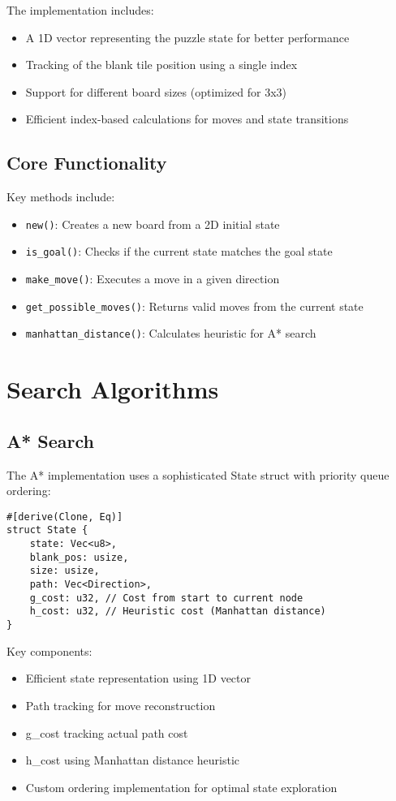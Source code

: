 \documentclass[a4paper]{article}
\begin{document}
The implementation includes:
\begin{itemize}
    \item A 1D vector representing the puzzle state for better performance
    \item Tracking of the blank tile position using a single index
    \item Support for different board sizes (optimized for 3x3)
    \item Efficient index-based calculations for moves and state transitions
\end{itemize}

\subsection{Core Functionality}
Key methods include:
\begin{itemize}
    \item \texttt{new()}: Creates a new board from a 2D initial state
    \item \texttt{is\_goal()}: Checks if the current state matches the goal state
    \item \texttt{make\_move()}: Executes a move in a given direction
    \item \texttt{get\_possible\_moves()}: Returns valid moves from the current state
    \item \texttt{manhattan\_distance()}: Calculates heuristic for A* search
\end{itemize}

\section{Search Algorithms}
\subsection{A* Search}
The A* implementation uses a sophisticated State struct with priority queue ordering:

\begin{lstlisting}[style=rustcode]
#[derive(Clone, Eq)]
struct State {
    state: Vec<u8>,
    blank_pos: usize,
    size: usize,
    path: Vec<Direction>,
    g_cost: u32, // Cost from start to current node
    h_cost: u32, // Heuristic cost (Manhattan distance)
}
\end{lstlisting}

Key components:
\begin{itemize}
    \item Efficient state representation using 1D vector
    \item Path tracking for move reconstruction
    \item g\_cost tracking actual path cost
    \item h\_cost using Manhattan distance heuristic
    \item Custom ordering implementation for optimal state exploration
\end{itemize}
\end{document}
